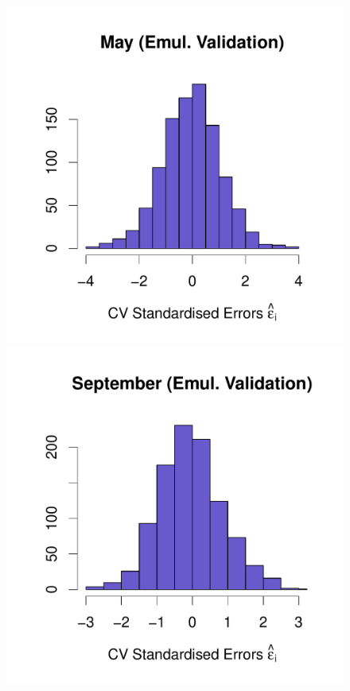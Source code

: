\documentclass[a4paper, 12pt]{article}
\begin{document}
\begin{figure}
 \includegraphics[width=\scale]{Emulator_CV/Histograms/May_CV_Errors_Hist}\hspace{-3ex}
 \includegraphics[width=\scale]{Emulator_CV/Histograms/September_CV_Errors_Hist}\\[-1ex]

\end{figure}
\end{document}
